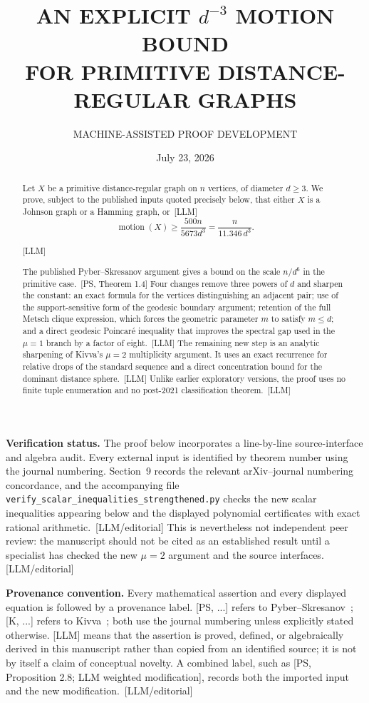 \documentclass[10pt]{amsart}
\title[AN EXPLICIT $d^{-3}$ MOTION BOUND]{AN EXPLICIT $d^{-3}$ MOTION BOUND\\ FOR PRIMITIVE DISTANCE-REGULAR GRAPHS}
\author{MACHINE-ASSISTED PROOF DEVELOPMENT}
\date{July 23, 2026}
\theoremstyle{remark}
\DeclareMathOperator{\motion}{motion}
\newcommand{\prov}[1]{\unskip\, {\normalfont\scriptsize\color{provgray}\textsf{[#1]}}}
\newcommand{\eqprov}[1]{%
  \par\nobreak\vspace{-0.68\baselineskip}%
  \noindent\hfill{\normalfont\scriptsize\color{provgray}\textsf{[#1]}}%
  \par\vspace{0.20\baselineskip}%
}
\begin{document}
\begin{abstract}
Let $X$ be a primitive distance-regular graph on $n$ vertices, of diameter $d\ge 3$. We prove, subject to the published inputs quoted precisely below, that either $X$ is a Johnson graph or a Hamming graph, or\prov{LLM}
\[
\motion(X)\ge \frac{500n}{5673d^3}=\frac{n}{11.346\,d^3}.
\]
\eqprov{LLM}
The published Pyber--Skresanov argument gives a bound on the scale $n/d^6$ in the primitive case.\prov{PS, Theorem 1.4} Four changes remove three powers of $d$ and sharpen the constant: an exact formula for the vertices distinguishing an adjacent pair; use of the support-sensitive form of the geodesic boundary argument; retention of the full Metsch clique expression, which forces the geometric parameter $m$ to satisfy $m\le d$; and a direct geodesic Poincar\'e inequality that improves the spectral gap used in the $\mu=1$ branch by a factor of eight.\prov{LLM} The remaining new step is an analytic sharpening of Kivva's $\mu=2$ multiplicity argument. It uses an exact recurrence for relative drops of the standard sequence and a direct concentration bound for the dominant distance sphere.\prov{LLM} Unlike earlier exploratory versions, the proof uses no finite tuple enumeration and no post-2021 classification theorem.\prov{LLM}
\end{abstract}

\maketitle

\noindent\textbf{Verification status.}
The proof below incorporates a line-by-line source-interface and algebra audit. Every external input is identified by theorem number using the journal numbering. Section~9 records the relevant arXiv--journal numbering concordance, and the accompanying file \texttt{verify\_scalar\_inequalities\_strengthened.py} checks the new scalar inequalities appearing below and the displayed polynomial certificates with exact rational arithmetic.\prov{LLM/editorial} This is nevertheless not independent peer review: the manuscript should not be cited as an established result until a specialist has checked the new $\mu=2$ argument and the source interfaces.\prov{LLM/editorial}

\medskip
\noindent\textbf{Provenance convention.}
Every mathematical assertion and every displayed equation is followed by a provenance label. \textsf{[PS, ...]} refers to Pyber--Skresanov~\cite{PyberSkresanov}; \textsf{[K, ...]} refers to Kivva~\cite{Kivva}; both use the journal numbering unless explicitly stated otherwise. \textsf{[LLM]} means that the assertion is proved, defined, or algebraically derived in this manuscript rather than copied from an identified source; it is not by itself a claim of conceptual novelty. A combined label, such as \textsf{[PS, Proposition 2.8; LLM weighted modification]}, records both the imported input and the new modification.\prov{LLM/editorial}
\end{document}
